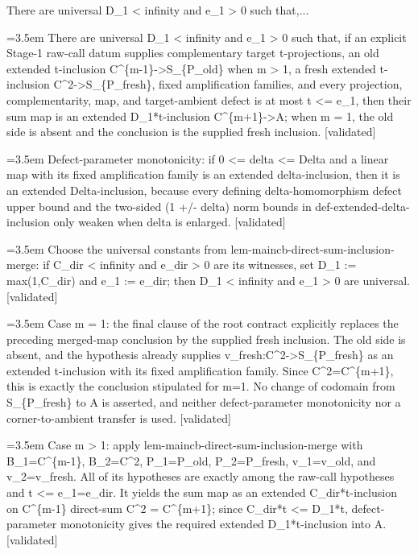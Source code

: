 \documentclass{article}
\newcommand{\step}[1]{\par\noindent\hangindent=3.5em\hangafter=1%
  \makebox[3.5em][l]{\textbf{#1.}}}
\newcommand{\steptag}[1]{\hfill{\small\textsf{[#1]}}}
\begin{document}
\begin{proofbox}{There are universal D\_1 < infinity and e\_1 > 0 such that,...}
\step{1} There are universal D\_1 < infinity and e\_1 > 0 such that, if an explicit Stage-1 raw-call datum supplies complementary target t-projections, an old extended t-inclusion C\textasciicircum{}\{m-1\}->S\_\{P\_old\} when m > 1, a fresh extended t-inclusion C\textasciicircum{}2->S\_\{P\_fresh\}, fixed amplification families, and every projection, complementarity, map, and target-ambient defect is at most t <= e\_1, then their sum map is an extended D\_1*t-inclusion C\textasciicircum{}\{m+1\}->A; when m = 1, the old side is absent and the conclusion is the supplied fresh inclusion. \steptag{validated} \\[6pt]
\step{1.1} Defect-parameter monotonicity: if 0 <= delta <= Delta and a linear map with its fixed amplification family is an extended delta-inclusion, then it is an extended Delta-inclusion, because every defining delta-homomorphism defect upper bound and the two-sided (1 +/- delta) norm bounds in def-extended-delta-inclusion only weaken when delta is enlarged. \steptag{validated} \\[4pt]
\step{1.2} Choose the universal constants from lem-maincb-direct-sum-inclusion-merge: if C\_dir < infinity and e\_dir > 0 are its witnesses, set D\_1 := max(1,C\_dir) and e\_1 := e\_dir; then D\_1 < infinity and e\_1 > 0 are universal. \steptag{validated} \\[4pt]
\step{1.3} Case m = 1: the final clause of the root contract explicitly replaces the preceding merged-map conclusion by the supplied fresh inclusion. The old side is absent, and the hypothesis already supplies v\_fresh:C\textasciicircum{}2->S\_\{P\_fresh\} as an extended t-inclusion with its fixed amplification family. Since C\textasciicircum{}2=C\textasciicircum{}\{m+1\}, this is exactly the conclusion stipulated for m=1. No change of codomain from S\_\{P\_fresh\} to A is asserted, and neither defect-parameter monotonicity nor a corner-to-ambient transfer is used. \steptag{validated} \\[4pt]
\step{1.4} Case m > 1: apply lem-maincb-direct-sum-inclusion-merge with B\_1=C\textasciicircum{}\{m-1\}, B\_2=C\textasciicircum{}2, P\_1=P\_old, P\_2=P\_fresh, v\_1=v\_old, and v\_2=v\_fresh. All of its hypotheses are exactly among the raw-call hypotheses and t <= e\_1=e\_dir. It yields the sum map as an extended C\_dir*t-inclusion on C\textasciicircum{}\{m-1\} direct-sum C\textasciicircum{}2 = C\textasciicircum{}\{m+1\}; since C\_dir*t <= D\_1*t, defect-parameter monotonicity gives the required extended D\_1*t-inclusion into A. \steptag{validated} \\[4pt]
\end{proofbox}
\end{document}

